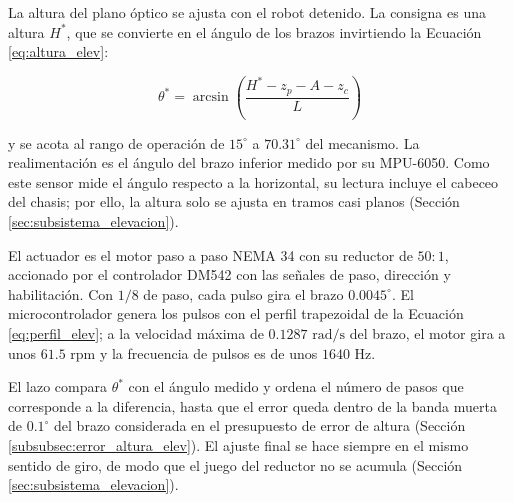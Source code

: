 \documentclass[../../General.tex]{subfiles}
\begin{document}
La altura del plano óptico se ajusta con el robot detenido. La consigna es una altura $H^{*}$, que se convierte en el ángulo de los brazos invirtiendo la Ecuación \ref{eq:altura_elev}:

\begin{equation}\label{eq:consigna_altura}
    \theta^{*} = \arcsin\left( \frac{H^{*} - z_p - A - z_c}{L} \right)
\end{equation}

y se acota al rango de operación de $15^\circ$ a $70.31^\circ$ del mecanismo. La realimentación es el ángulo del brazo inferior medido por su MPU-6050. Como este sensor mide el ángulo respecto a la horizontal, su lectura incluye el cabeceo del chasis; por ello, la altura solo se ajusta en tramos casi planos (Sección \ref{sec:subsistema_elevacion}).

El actuador es el motor paso a paso NEMA 34 con su reductor de $50:1$, accionado por el controlador DM542 con las señales de paso, dirección y habilitación. Con $1/8$ de paso, cada pulso gira el brazo $0.0045^\circ$. El microcontrolador genera los pulsos con el perfil trapezoidal de la Ecuación \ref{eq:perfil_elev}; a la velocidad máxima de $0.1287\text{ rad/s}$ del brazo, el motor gira a unos $61.5\text{ rpm}$ y la frecuencia de pulsos es de unos $1640\text{ Hz}$.

El lazo compara $\theta^{*}$ con el ángulo medido y ordena el número de pasos que corresponde a la diferencia, hasta que el error queda dentro de la banda muerta de $0.1^\circ$ del brazo considerada en el presupuesto de error de altura (Sección \ref{subsubsec:error_altura_elev}). El ajuste final se hace siempre en el mismo sentido de giro, de modo que el juego del reductor no se acumula (Sección \ref{sec:subsistema_elevacion}).
\end{document}
